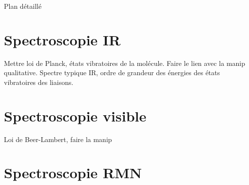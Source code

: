 \begin{reportBlock}{Plan détaillé}
\section{Spectroscopie IR}
Mettre loi de Planck, états vibratoires de la molécule. Faire le lien avec la manip qualitative. Spectre typique IR, ordre de grandeur des énergies des états vibratoires des liaisons.

\section{Spectroscopie visible}
Loi de Beer-Lambert, faire la manip 

\section{Spectroscopie RMN}

\end{reportBlock}